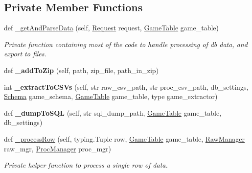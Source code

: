 \subsection*{Private Member Functions}
\begin{DoxyCompactItemize}
\item 
def \mbox{\hyperlink{class_export_manager_1_1_export_manager_a28f129343909f342bf36e8597c774dfe}{\+\_\+get\+And\+Parse\+Data}} (self, \mbox{\hyperlink{class_request_1_1_request}{Request}} request, \mbox{\hyperlink{class_game_table_1_1_game_table}{Game\+Table}} game\+\_\+table)
\begin{DoxyCompactList}\small\item\em Private function containing most of the code to handle processing of db data, and export to files. \end{DoxyCompactList}\item 
\mbox{\label{class_export_manager_1_1_export_manager_a9e7e89443ff0e8c53ca263458d19b436}} 
def {\bfseries \+\_\+add\+To\+Zip} (self, path, zip\+\_\+file, path\+\_\+in\+\_\+zip)
\item 
\mbox{\label{class_export_manager_1_1_export_manager_aef9de0260d8e5ffb874013c5d70acb30}} 
int {\bfseries \+\_\+extract\+To\+C\+S\+Vs} (self, str raw\+\_\+csv\+\_\+path, str proc\+\_\+csv\+\_\+path, db\+\_\+settings, \mbox{\hyperlink{classschemas_1_1_schema_1_1_schema}{Schema}} game\+\_\+schema, \mbox{\hyperlink{class_game_table_1_1_game_table}{Game\+Table}} game\+\_\+table, type game\+\_\+extractor)
\item 
\mbox{\label{class_export_manager_1_1_export_manager_ae1d703048af64dfe16d7f8189c0e2096}} 
def {\bfseries \+\_\+dump\+To\+S\+QL} (self, str sql\+\_\+dump\+\_\+path, \mbox{\hyperlink{class_game_table_1_1_game_table}{Game\+Table}} game\+\_\+table, db\+\_\+settings)
\item 
def \mbox{\hyperlink{class_export_manager_1_1_export_manager_ad99af90a049579cac2eed0407445b39a}{\+\_\+process\+Row}} (self, typing.\+Tuple row, \mbox{\hyperlink{class_game_table_1_1_game_table}{Game\+Table}} game\+\_\+table, \mbox{\hyperlink{class_raw_manager}{Raw\+Manager}} raw\+\_\+mgr, \mbox{\hyperlink{class_proc_manager}{Proc\+Manager}} proc\+\_\+mgr)
\begin{DoxyCompactList}\small\item\em Private helper function to process a single row of data. \end{DoxyCompactList}\item 

\end{DoxyCompactItemize}
